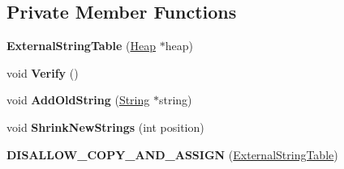 \subsection*{Private Member Functions}
\begin{DoxyCompactItemize}
\item 
{\bfseries External\+String\+Table} (\hyperlink{classv8_1_1internal_1_1_heap}{Heap} $\ast$heap)\hypertarget{classv8_1_1internal_1_1_heap_1_1_external_string_table_a6a3aee3e7e1917301515bed44d6bd78a}{}\label{classv8_1_1internal_1_1_heap_1_1_external_string_table_a6a3aee3e7e1917301515bed44d6bd78a}

\item 
void {\bfseries Verify} ()\hypertarget{classv8_1_1internal_1_1_heap_1_1_external_string_table_ada8e249ed534d3fad7a4f273fb9d3f51}{}\label{classv8_1_1internal_1_1_heap_1_1_external_string_table_ada8e249ed534d3fad7a4f273fb9d3f51}

\item 
void {\bfseries Add\+Old\+String} (\hyperlink{classv8_1_1internal_1_1_string}{String} $\ast$string)\hypertarget{classv8_1_1internal_1_1_heap_1_1_external_string_table_a96528a269b1edee51e8f8c8df4f900ef}{}\label{classv8_1_1internal_1_1_heap_1_1_external_string_table_a96528a269b1edee51e8f8c8df4f900ef}

\item 
void {\bfseries Shrink\+New\+Strings} (int position)\hypertarget{classv8_1_1internal_1_1_heap_1_1_external_string_table_acd28092cb9066ffc5370932aff9eb37a}{}\label{classv8_1_1internal_1_1_heap_1_1_external_string_table_acd28092cb9066ffc5370932aff9eb37a}

\item 
{\bfseries D\+I\+S\+A\+L\+L\+O\+W\+\_\+\+C\+O\+P\+Y\+\_\+\+A\+N\+D\+\_\+\+A\+S\+S\+I\+GN} (\hyperlink{classv8_1_1internal_1_1_heap_1_1_external_string_table}{External\+String\+Table})\hypertarget{classv8_1_1internal_1_1_heap_1_1_external_string_table_a3c0872fb8a0b2f77810d673c97c8cdb8}{}\label{classv8_1_1internal_1_1_heap_1_1_external_string_table_a3c0872fb8a0b2f77810d673c97c8cdb8}

\end{DoxyCompactItemize}
